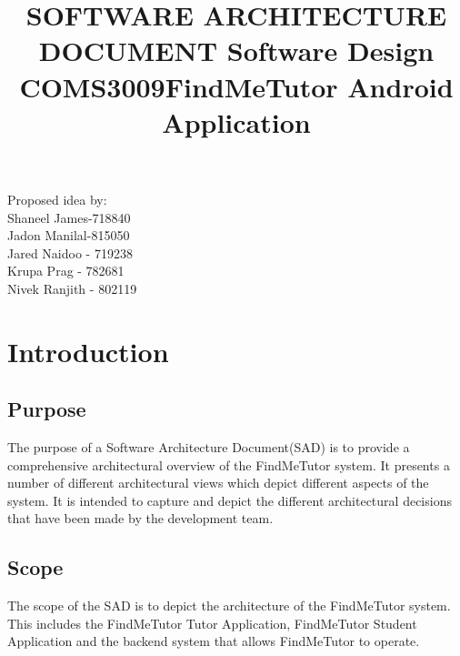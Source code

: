 \documentclass[12pt]{article}
\begin{document}
\title{\textbf{SOFTWARE ARCHITECTURE DOCUMENT }}
\maketitle

\begin{center}
\title{\textbf{Software Design COMS3009}}
\maketitle
\end{center}
\begin{center}
\title{\textbf{FindMeTutor Android Application}}
\maketitle
\end{center}

\begin{center}
Proposed idea by:\\
Shaneel James-718840
\\Jadon Manilal-815050
\\Jared Naidoo - 719238
\\Krupa Prag - 782681
\\Nivek Ranjith - 802119
\end{center}


\newpage
\tableofcontents
\newpage


\section{\textbf{Introduction}}
\subsection{Purpose}
The purpose of a Software Architecture Document(SAD) is to provide a comprehensive architectural overview of the FindMeTutor system. It presents a number of different architectural views which depict different aspects of the system. It is intended to capture and depict the different architectural decisions that have been made by the development team.

\subsection{Scope}
The scope of the SAD is to depict the architecture of the FindMeTutor system. This includes the FindMeTutor Tutor Application, FindMeTutor Student Application and the backend system that allows FindMeTutor to operate.
\end{document}
